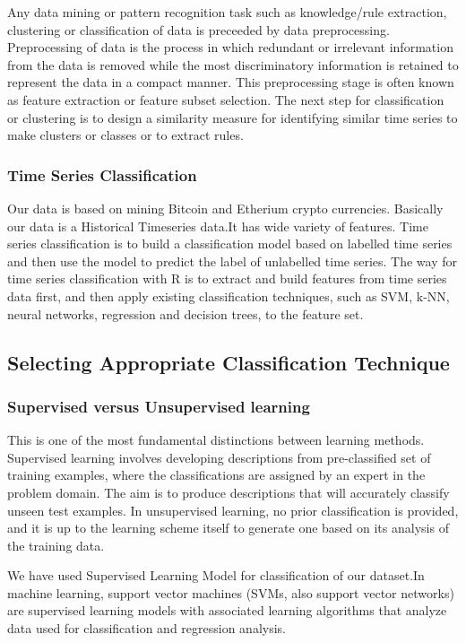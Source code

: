 \documentclass{article}
\begin{document}
Any data mining or pattern recognition task such as
knowledge/rule extraction, clustering or classification of data is preceeded by data preprocessing. Preprocessing of data is the process in which redundant or irrelevant information from the data is removed while the most discriminatory information is retained to represent the data in a compact manner. This preprocessing stage is often known as feature extraction or feature subset selection. The next step for classification
or clustering is to design a similarity measure for
identifying similar time series to make clusters or classes or to extract rules.

\subsubsection {Time Series Classification}
Our data is based on mining Bitcoin and Etherium crypto currencies. Basically our data is a Historical Timeseries data.It has wide variety of features.
Time series classification is to build a classification model based on labelled time series and then use the model to predict the label of unlabelled time series. The way for time series classification with R is to extract and build features from time series data first, and then apply existing classification techniques, such as SVM, k-NN, neural networks, regression and decision trees, to the feature set.

\subsection{Selecting Appropriate Classification
Technique }

\subsubsection {Supervised versus Unsupervised learning} This is one of the most fundamental distinctions between learning methods. Supervised learning involves developing descriptions from pre-classified set of training examples, where the classifications are assigned by an expert in the problem domain. The aim is to produce descriptions that will accurately classify unseen test examples. In unsupervised learning, no prior classification is provided, and it is up to the learning scheme itself to generate one based on its analysis of the training data. \newline

We have used Supervised Learning Model for classification of our dataset.In machine learning, support vector machines (SVMs, also support vector networks) are supervised learning models with associated learning algorithms that analyze data used for classification and regression analysis. 
\end{document}
